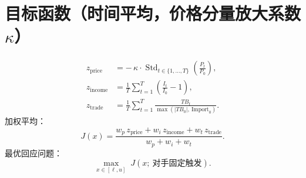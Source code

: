 \documentclass{article}
\begin{document}
\section*{目标函数（时间平均，价格分量放大系数 $\kappa$）}
\begin{align*}
z_{\text{price}} &= -\,\kappa \cdot \operatorname{Std}_{t\in\{1,\dots,T\}}\!\left(\frac{P_t}{P_0}\right),\\
z_{\text{income}} &= \frac{1}{T}\sum_{t=1}^{T}\left(\frac{I_t}{I_0}-1\right),\\
z_{\text{trade}} &= \frac{1}{T}\sum_{t=1}^{T}\frac{TB_t}{\max(|TB_0|,\ \text{Import}_0)}.
\end{align*}
加权平均：
\[
J(x) = \frac{w_p\,z_{\text{price}} + w_i\,z_{\text{income}} + w_t\,z_{\text{trade}}}{w_p + w_i + w_t}.
\]
最优回应问题：
\[
\max_{x\in[\ell,u]} \; J(x;\ \text{对手固定触发}) .
\]

\end{document}
